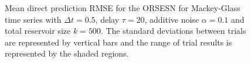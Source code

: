 \begin{figure}
    \centering




    \caption{Mean direct prediction RMSE for the ORSESN for Mackey-Glass time series with $\Delta t=0.5$, delay $\tau=20$, additive noise $\alpha=0.1$ and total reservoir size $k=500$. The standard deviations between trials are represented by vertical bars and the range of trial results is represented by the shaded regions.}
    \label{fig:ORSESN_mg_direct}
\end{figure}





